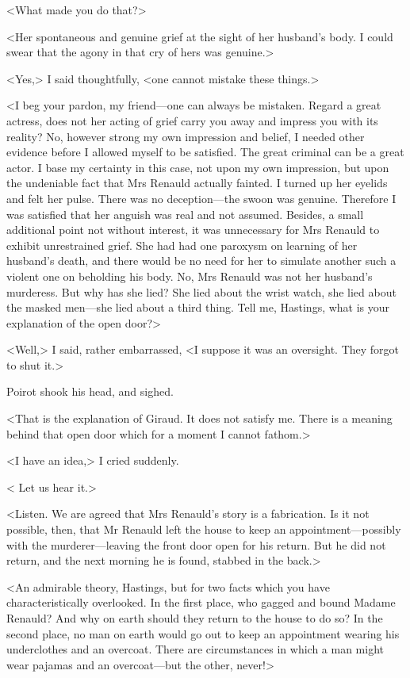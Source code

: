  <What made you do that?> 

 <Her spontaneous and genuine grief at the sight of her husband's body. I could swear that the agony in that cry of hers was genuine.> 

 <Yes,> I said thoughtfully, <one cannot mistake these things.> 

 <I beg your pardon, my friend—one can always be mistaken. Regard a great actress, does not her acting of grief carry you away and impress you with its reality? No, however strong my own impression and belief, I needed other evidence before I allowed myself to be satisfied. The great criminal can be a great actor. I base my certainty in this case, not upon my own impression, but upon the undeniable fact that Mrs Renauld actually fainted. I turned up her eyelids and felt her pulse. There was no deception—the swoon was genuine. Therefore I was satisfied that her anguish was real and not assumed. Besides, a small additional point not without interest, it was unnecessary for Mrs Renauld to exhibit unrestrained grief. She had had one paroxysm on learning of her husband's death, and there would be no need for her to simulate another such a violent one on beholding his body. No, Mrs Renauld was not her husband's murderess. But why has she lied? She lied about the wrist watch, she lied about the masked men—she lied about a third thing. Tell me, Hastings, what is your explanation of the open door?> 

 <Well,> I said, rather embarrassed, <I suppose it was an oversight. They forgot to shut it.> 

 Poirot shook his head, and sighed. 

 <That is the explanation of Giraud. It does not satisfy me. There is a meaning behind that open door which for a moment I cannot fathom.> 

 <I have an idea,> I cried suddenly. 

 < Let us hear it.> 

 <Listen. We are agreed that Mrs Renauld's story is a fabrication. Is it not possible, then, that Mr Renauld left the house to keep an appointment—possibly with the murderer—leaving the front door open for his return. But he did not return, and the next morning he is found, stabbed in the back.> 

 <An admirable theory, Hastings, but for two facts which you have characteristically overlooked. In the first place, who gagged and bound Madame Renauld? And why on earth should they return to the house to do so? In the second place, no man on earth would go out to keep an appointment wearing his underclothes and an overcoat. There are circumstances in which a man might wear pajamas and an overcoat—but the other, never!> 

